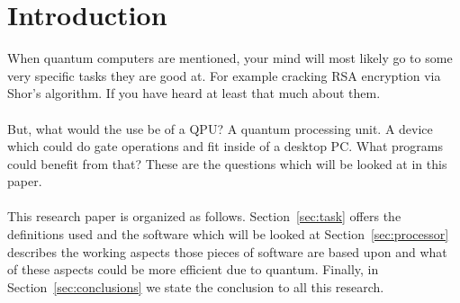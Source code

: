 \section{Introduction}
\label{sec:introduction}
%
%
When quantum computers are mentioned, your mind will most likely go to some very specific tasks they are good at. For example cracking RSA encryption via Shor's algorithm. If you have heard at least that much about them. \\
\\
But, what would the use be of a QPU? A quantum processing unit. A device which could do gate operations and fit inside of a desktop PC. What programs could benefit from that? These are the questions which will be looked at in this paper.\\
\\ 





%
%
This research paper is organized as follows. Section~\ref{sec:task} offers
the definitions used and the software which will be looked at Section~\ref{sec:processor} describes the working aspects those pieces of software are based upon and what of these aspects could be more efficient due to quantum. Finally, in Section~\ref{sec:conclusions} we state the conclusion to all this research.
